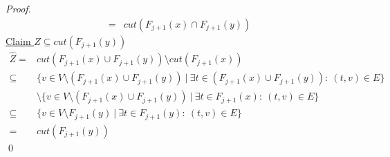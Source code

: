 \begin{proof}
\begin{align*}
    =& cut(F_{j+1}(x) \cap F_{j+1}(y))
\end{align*}
\underline{Claim $\hat{Z} \subseteq cut(F_{j+1}(y))$}
\begin{align*}
    \hat{Z} =& cut(F_{j+1}(x) \cup F_{j+1}(y)) \setminus cut(F_{j+1}(x))\\
    \subseteq& \{v \in V\setminus \left(F_{j+1}(x) \cup F_{j+1}(y)\right) \ | \ \exists t \in \left(F_{j+1}(x) \cup F_{j+1}(y)\right): \ (t,v)\in E\} \\
    &\setminus \{v \in V\setminus \left(F_{j+1}(x) \cup F_{j+1}(y)\right) \ | \ \exists t \in F_{j+1}(x): \ (t,v)\in E\}\\
    \subseteq& \{v \in V\setminus F_{j+1}(y) \ | \ \exists t \in F_{j+1}(y): \ (t,v)\in E\} \\
    =& cut(F_{j+1}(y))
\end{align*}
\qed
\end{proof}